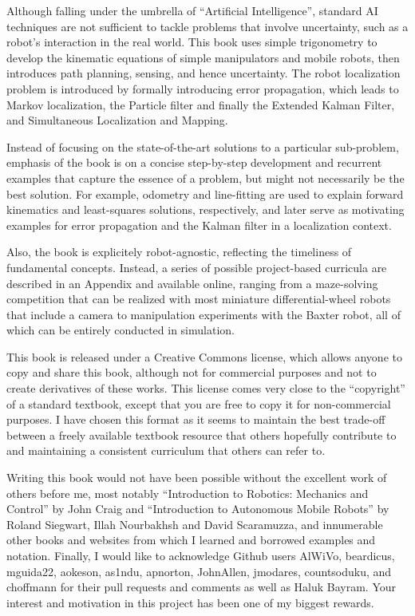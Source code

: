 \documentclass[paper=6.14in:9.21in,pagesize=pdftex,11pt,twoside,openright]{scrbook}
\begin{document}
Although falling under the umbrella of ``Artificial Intelligence'', standard AI techniques are not sufficient to tackle problems that involve uncertainty, such as a robot's interaction in the real world. This book uses simple trigonometry to develop the kinematic equations of simple manipulators and mobile robots, then introduces path planning, sensing, and hence uncertainty. The robot localization problem is introduced by formally introducing error propagation, which leads to Markov localization, the Particle filter and finally the Extended Kalman Filter, and Simultaneous Localization and Mapping. 

Instead of focusing on the state-of-the-art solutions to a particular sub-problem, emphasis of the book is on a concise step-by-step development and recurrent examples that capture the essence of a problem, but might not necessarily be the best solution. For example, odometry and line-fitting are used to explain forward kinematics and least-squares solutions, respectively, and later serve as motivating examples for error propagation and the Kalman filter in a localization context.

Also, the book is explicitely robot-agnostic, reflecting the timeliness of fundamental concepts. Instead, a series of possible project-based curricula are described in an Appendix and available online, ranging from a maze-solving competition that can be realized with most miniature differential-wheel robots that include a camera to manipulation experiments with the Baxter robot, all of which can be entirely conducted in simulation. 

This book is released under a Creative Commons license, which allows anyone to copy and share this book, although not for commercial purposes and not to create derivatives of these works. This license comes very close to the ``copyright'' of a standard textbook, except that you are free to copy it for non-commercial purposes. I have chosen this format as it seems to maintain the best trade-off between a freely available textbook resource that others hopefully contribute to and maintaining a consistent curriculum that others can refer to.   

Writing this book would not have been possible without the excellent work of others before me, most notably ``Introduction to Robotics: Mechanics and Control'' by John Craig and ``Introduction to Autonomous Mobile Robots'' by Roland Siegwart, Illah Nourbakhsh and David Scaramuzza, and innumerable other books and websites from which I learned and borrowed examples and notation. Finally, I would like to acknowledge Github users AlWiVo, beardicus, mguida22, aokeson, as1ndu, apnorton, JohnAllen, jmodares, countsoduku, and choffmann for their pull requests and comments as well as Haluk Bayram. Your interest and motivation in this project has been one of my biggest rewards.  
\end{document}
